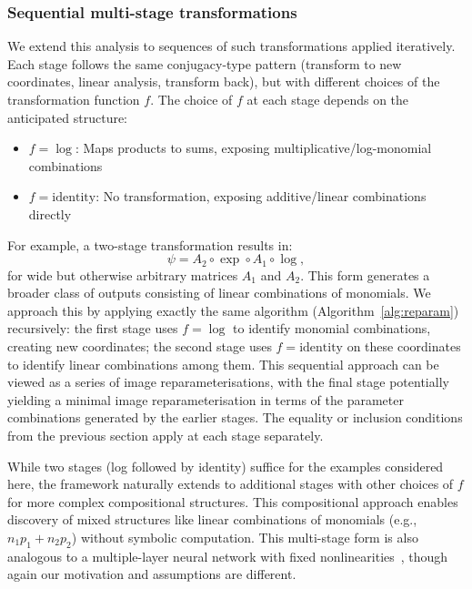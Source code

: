 \subsubsection{Sequential multi-stage transformations}
We extend this analysis to sequences of such transformations applied iteratively. Each stage follows the same conjugacy-type pattern (transform to new coordinates, linear analysis, transform back), but with different choices of the transformation function $f$. The choice of $f$ at each stage depends on the anticipated structure:
\begin{itemize}
\item $f = \log$: Maps products to sums, exposing multiplicative/log-monomial combinations
\item $f = \text{identity}$: No transformation, exposing additive/linear combinations directly
\end{itemize}

For example, a two-stage transformation results in:
\begin{equation}
\psi = A_2 \circ \exp \circ A_1 \circ \log,
\end{equation}
for wide but otherwise arbitrary matrices $A_1$ and $A_2$. This form generates a broader class of outputs consisting of linear combinations of monomials. We approach this by applying exactly the same algorithm (Algorithm~\ref{alg:reparam}) recursively: the first stage uses $f=\log$ to identify monomial combinations, creating new coordinates; the second stage uses $f=\text{identity}$ on these coordinates to identify linear combinations among them. This sequential approach can be viewed as a series of image reparameterisations, with the final stage potentially yielding a minimal image reparameterisation in terms of the parameter combinations generated by the earlier stages. The equality or inclusion conditions from the previous section apply at each stage separately.

While two stages (log followed by identity) suffice for the examples considered here, the framework naturally extends to additional stages with other choices of $f$ for more complex compositional structures. This compositional approach enables discovery of mixed structures like linear combinations of monomials (e.g., $n_1p_1 + n_2p_2$) without symbolic computation. This multi-stage form is also analogous to a multiple-layer neural network with fixed nonlinearities~\cite{Goodfellow2016}, though again our motivation and assumptions are different.

